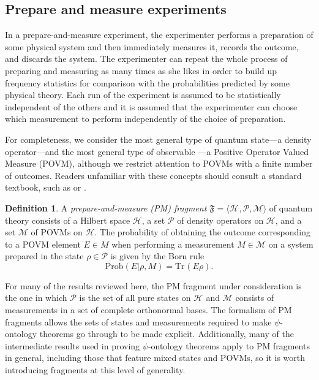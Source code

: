 \documentclass[DIV=calc,paper=a4,fontsize=11pt,twocolumn]{scrartcl} %
\theoremstyle{definition}
\newtheorem{definition}{Definition}[section]
\theoremstyle{plain}
\newcommand{\Hilb}[1][]{\ensuremath{\mathcal{H}_{#1}}}
\newcommand{\Tr}[2][]{\ensuremath{\text{Tr}_{#1} \left ( #2 \right )}}
\begin{document}
\subsection{Prepare and measure experiments}

\label{PME}

In a prepare-and-measure experiment, the experimenter performs a
preparation of some physical system and then immediately measures it,
records the outcome, and discards the system.  The experimenter can
repeat the whole process of preparing and measuring as many times as
she likes in order to build up frequency statistics for comparison
with the probabilities predicted by some physical theory.  Each run of
the experiment is assumed to be statistically independent of the
others and it is assumed that the experimenter can choose which
measurement to perform independently of the choice of preparation.

For completeness, we consider the most general type of quantum
state---a density operator---and the most general type of observable
---a Positive Operator Valued Measure (POVM), although we restrict
attention to POVMs with a finite number of outcomes.  Readers
unfamiliar with these concepts should consult a standard textbook,
such as \cite{Nielsen2000} or \cite{Heinosaari2011}.

\begin{definition}
\label{def:Form:PM}
A \emph{prepare-and-measure (PM) fragment} $\mathfrak{F} = \langle
\Hilb, \mathcal{P}, \mathcal{M} \rangle$ of quantum theory consists
of a Hilbert space $\mathcal{H}$, a set $\mathcal{P}$ of density
operators on $\mathcal{H}$, and a set $\mathcal{M}$ of POVMs on
$\mathcal{H}$.  The probability of obtaining the outcome
corresponding to a POVM element $E \in M$ when performing a
measurement $M \in \mathcal{M}$ on a system prepared in the state
$\rho \in \mathcal{P}$ is given by the Born rule
\begin{equation}
\label{eq:Form:qprob}
\text{Prob}(E|\rho, M) = \Tr{E \rho}.
\end{equation}
\end{definition}

For many of the results reviewed here, the PM fragment under
consideration is the one in which $\mathcal{P}$ is the set of all pure
states on $\Hilb$ and $\mathcal{M}$ consists of measurements in a set
of complete orthonormal bases.  The formalism of PM fragments allows
the sets of states and measurements required to make $\psi$-ontology
theorems go through to be made explicit.  Additionally, many of the
intermediate results used in proving $\psi$-ontology theorems apply to
PM fragments in general, including those that feature mixed states and
POVMs, so it is worth introducing fragments at this level of
generality.
\end{document}
